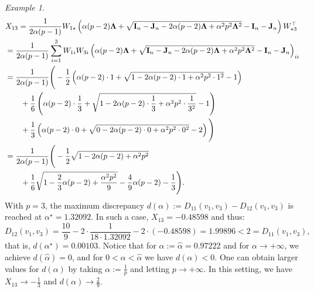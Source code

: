 \documentclass[12pt]{article}
\theoremstyle{plain}
\theoremstyle{remark}
\newtheorem*{example}{Example}
\newcommand{\round}[1]{\left( #1 \right)}
\newcommand{\ie}{\textit{i.e. }}
\newcommand{\latMatr}[1]{\mathbf{#1}}          %
\newcommand{\grMatr}[1]{{\boldsymbol{#1}}}   %
\begin{document}
\begin{example}
\begin{align*}
            \allowdisplaybreaks
            &{{X}}_{13}=\frac{1}{2\alpha (p-1)} {{W}}_{1\star} \round{\alpha(p-2){\grMatr{\Lambda}} + \sqrt{ {\latMatr{I}_n - \latMatr{J}_n} - 2 \alpha (p-2){\grMatr{\Lambda}} + \alpha^2 p^2 {\grMatr{\Lambda}}^2} -{\latMatr{I}_n}-\latMatr{J}_n} {{W}}^\top_{\star3}\\
            &=\frac{1}{2\alpha (p-1)} \sum_{i=1}^3 {{W}}_{1i}{{W}}_{3i} \round{\alpha(p-2){\grMatr{\Lambda}} + \sqrt{ {\latMatr{I}_n - \latMatr{J}_n} - 2 \alpha (p-2){\grMatr{\Lambda}} + \alpha^2 p^2 {\grMatr{\Lambda}}^2} -{\latMatr{I}_n}-\latMatr{J}_n}_{ii}\\
            &=\frac{1}{2\alpha (p-1)}\Bigg(
            -\frac{1}{2}\round{\alpha (p-2)\cdot 1+\sqrt{1-2\alpha(p-2)\cdot 1 +\alpha^2 p^2 \cdot 1^2}-1}\\
            & \qquad + \frac{1}{6} \round{\alpha (p-2)\cdot \frac{1}{3}+\sqrt{1-2\alpha(p-2)\cdot \frac{1}{3} +\alpha^2 p^2 \cdot \frac{1}{3^2}}-1} \\
            & \qquad + \frac{1}{3} \round{\alpha (p-2) \cdot 0 + \sqrt{0-2\alpha (p-2)\cdot 0 + \alpha^2 p^2 \cdot 0^2}-2}
            \Bigg)\\
            &=\frac{1}{2\alpha (p-1)} \Bigg(-\frac{1}{2} \sqrt{1-2\alpha(p-2)+\alpha^2 p^2}\\
            &\qquad +\frac{1}{6}\sqrt{1-\frac{2}{3}\alpha(p-2)+\frac{\alpha^2 p^2}{9}} -\frac{4}{9} \alpha (p-2) -\frac{1}{3}
            \Bigg).
        \end{align*}
        {
        With $p=3$, the maximum discrepancy $d(\alpha):=D_{11}(v_1,v_3)-D_{12}(v_1,v_3)$ is reached at $\alpha^\star=1.32092$. In such a case, ${X}_{13}=-0.48598$ and thus:
        \begin{equation*}
            D_{12}(v_1,v_3)=\frac{10}{9} - 2\cdot \frac{1}{18\cdot 1.32092} - 2\cdot (-0.48598)=1.99896<2=D_{11}(v_1,v_3),
        \end{equation*}
        that is, $d(\alpha^\star)=0.00103.$ Notice that for $\alpha:=\hat \alpha=0.97222$ and for $\alpha\to+\infty$, we achieve %
        $d(\hat\alpha)=0$, and for $0<\alpha<\hat\alpha$ we have $d(\alpha)<0$.  %
        One can obtain larger values for $d(\alpha)$ by taking $\alpha:=\frac{1}{p}$ and letting $p\to +\infty$. In this setting, we have ${X}_{13}\to -\frac{1}{3}$ and $d(\alpha)\to \frac{2}{9}$}.%
    \end{example}

\end{document}
